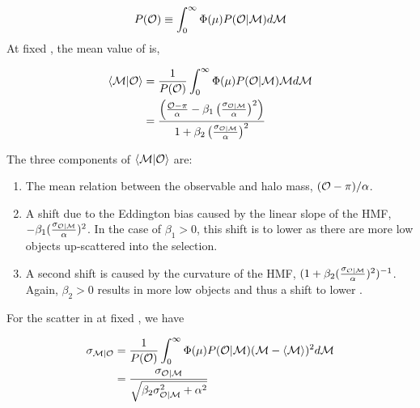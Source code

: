 \documentclass[fleqn,usenatbib,useAMS]{mnras}
\begin{document}
    \begin{equation}
        P({\mathcal{O}}{}) \equiv \int_{0}^{\infty} \Phi(\mu){} P({\mathcal{O}}{} | {\mathcal{M}}{}) d{\mathcal{M}}{}
    \end{equation}
    At fixed \obsSym{}, the mean value of \haloSym{} is,

    \begin{equation}
    \begin{aligned}
        \langle {\mathcal{M}}{} | {\mathcal{O}} \rangle
        &= \frac{1}{P({\mathcal{O}})}
            \int_{0}^{\infty} \Phi(\mu){} P({\mathcal{O}}{} | {\mathcal{M}}{}) {\mathcal{M}}{} d{\mathcal{M}}{} \\
        &= \frac{\left( \frac{{\mathcal{O}}- \pi}{\alpha} - \beta_1 \left(\frac{\sigma_{\mathcal{O} | \mathcal{M}}}{\alpha}\right)^2 \right)}{ 1 + \beta_2 \left(\frac{\sigma_{\mathcal{O} | \mathcal{M}}}{\alpha}\right)^2}
        \label{eq:mean_of_mu}
    \end{aligned}
    \end{equation}

    \noindent The three components of $\langle {\mathcal{M}}{} | {\mathcal{O}} \rangle$ are:

    \begin{enumerate}

        \item The mean relation between the observable and halo mass, $({\mathcal{O}}- \pi) / \alpha$.

        \item A shift due to the Eddington bias caused by the linear slope of the HMF, $-\beta_1
            (\frac{\sigma_{\mathcal{O} | \mathcal{M}}}{\alpha})^2$. In the case of $\beta_1 > 0$, this shift is to
            lower \haloSym{} as there are more low \haloSym{} objects up-scattered into the
            selection.

        \item A second shift is caused by the curvature of the HMF, $(1
            + \beta_2 (\frac{\sigma_{\mathcal{O} | \mathcal{M}}}{\alpha})^2)^{-1}$. 
            Again, $\beta_2 > 0$ results in more low \haloSym{} objects and thus a shift to lower 
            \haloSym{}.

    \end{enumerate}

    For the scatter in \haloSym{} at fixed \obsSym{}, we have

    \begin{equation}
    \begin{aligned}
        \sigma_{\mathcal{M} | \mathcal{O}}{}
        &= \frac{1}{P({\mathcal{O}}{})}
            \int_{0}^{\infty} \Phi(\mu){} P({\mathcal{O}}{} | {\mathcal{M}}{}) ( {\mathcal{M}}{}  - \langle {\mathcal{M}}{}
            \rangle )^2 d{\mathcal{M}}{} \\
    	&= \frac{\sigma_{\mathcal{O} | \mathcal{M}}}{\sqrt{\beta_2 \sigma_{\mathcal{O} | \mathcal{M}}^2 + \alpha^2}}
        \label{eq:scatter_of_mu}
    \end{aligned}
    \end{equation}
\end{document}
